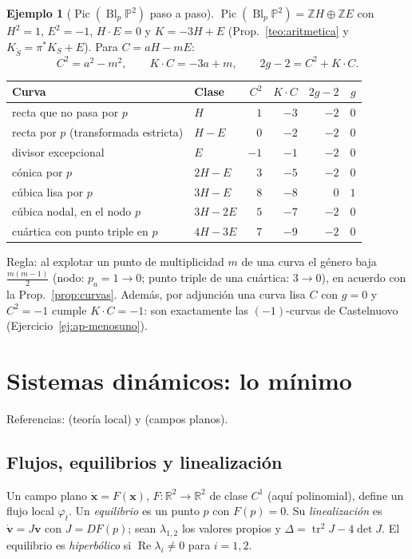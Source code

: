 \documentclass[11pt,a4paper,oneside]{book}
\newcommand{\Bl}{\operatorname{Bl}}
\newcommand{\Pic}{\operatorname{Pic}}
\newcommand{\tr}{\operatorname{tr}}
\newcommand{\PP}{\mathbb{P}}
\newcommand{\ZZ}{\mathbb{Z}}
\newcommand{\RR}{\mathbb{R}}
\theoremstyle{plain}
\theoremstyle{definition}
\newtheorem{ejemplo}[teorema]{Ejemplo}
\theoremstyle{remark}
\begin{document}
\begin{ejemplo}[$\Pic(\Bl_p\PP^2)$ paso a paso]\label{ej:picbl}
$\Pic(\Bl_p\PP^2)=\ZZ H\oplus\ZZ E$ con $H^2=1$, $E^2=-1$, $H\cdot E=0$ y $K=-3H+E$ (Prop.~\ref{teo:aritmetica} y $K_{\tilde S}=\pi^*K_S+E$). Para $C=aH-mE$:
\[
C^2=a^2-m^2,\qquad K\cdot C=-3a+m,\qquad 2g-2=C^2+K\cdot C.
\]
\begin{center}
\begin{tabular}{@{}llrrrr@{}}
\toprule
Curva & Clase & $C^2$ & $K\cdot C$ & $2g-2$ & $g$ \\
\midrule
recta que no pasa por $p$ & $H$ & $1$ & $-3$ & $-2$ & $0$ \\
recta por $p$ (transformada estricta) & $H-E$ & $0$ & $-2$ & $-2$ & $0$ \\
divisor excepcional & $E$ & $-1$ & $-1$ & $-2$ & $0$ \\
cónica por $p$ & $2H-E$ & $3$ & $-5$ & $-2$ & $0$ \\
cúbica lisa por $p$ & $3H-E$ & $8$ & $-8$ & $0$ & $1$ \\
cúbica nodal, en el nodo $p$ & $3H-2E$ & $5$ & $-7$ & $-2$ & $0$ \\
cuártica con punto triple en $p$ & $4H-3E$ & $7$ & $-9$ & $-2$ & $0$ \\
\bottomrule
\end{tabular}
\end{center}
Regla: al explotar un punto de multiplicidad $m$ de una curva el género baja $\tfrac{m(m-1)}2$ (nodo: $p_a=1\to0$; punto triple de una cuártica: $3\to0$), en acuerdo con la Prop.~\ref{prop:curvas}. Además, por adjunción una curva lisa $C$ con $g=0$ y $C^2=-1$ cumple $K\cdot C=-1$: son exactamente las $(-1)$-curvas de Castelnuovo (Ejercicio~\ref{ej:ap-menosuno}).
\end{ejemplo}

\chapter{Sistemas dinámicos: lo mínimo}\label{ap:dinamica}

Referencias: \cite{Per} (teoría local) y \cite{DLA} (campos planos).

\section{Flujos, equilibrios y linealización}

Un campo plano $\dot{\mathbf x}=F(\mathbf x)$, $F\colon\RR^2\to\RR^2$ de clase $C^1$ (aquí polinomial), define un flujo local $\varphi_t$. Un \emph{equilibrio} es un punto $p$ con $F(p)=0$. Su \emph{linealización} es $\dot{\mathbf v}=J\mathbf v$ con $J=DF(p)$; sean $\lambda_{1,2}$ los valores propios y $\Delta=\tr^2J-4\det J$. El equilibrio es \emph{hiperbólico} si $\operatorname{Re}\lambda_i\ne0$ para $i=1,2$.
\end{document}
